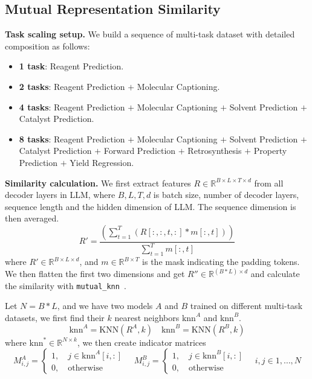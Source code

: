 \subsection{Mutual Representation Similarity}
\label{sec:simi}
\noindent\textbf{Task scaling setup.} We build a sequence of multi-task dataset with detailed composition as follows:
\begin{itemize}[leftmargin=*,nosep]
    \item \textbf{1 task}: Reagent Prediction.
    \item \textbf{2 tasks}: Reagent Prediction $+$ Molecular Captioning.
    \item \textbf{4 tasks}: Reagent Prediction $+$ Molecular Captioning $+$ Solvent Prediction $+$ Catalyst Prediction.
    \item \textbf{8 tasks}: Reagent Prediction $+$ Molecular Captioning $+$ Solvent Prediction $+$ Catalyst Prediction $+$ Forward Prediction $+$ Retrosynthesis $+$ Property Prediction $+$ Yield Regression.
\end{itemize}

\noindent\textbf{Similarity calculation.} We first extract features $R\in \mathbb{R}^{B\times L\times T\times d}$ from all decoder layers in LLM, where $B, L, T, d$ is batch size, number of decoder layers, sequence length and the hidden dimension of LLM. The sequence dimension is then averaged.
\begin{equation}
    R' = \frac{\left(\sum_{t=1}^{T} (R[:,:,t,:] * m[:,t])\right)}{\sum_{t=1}^{T} m[:,t]}
\end{equation}
where $R'\in\mathbb{R}^{B\times L\times d}$, and $m\in\mathbb{R}^{B\times T}$ is the mask indicating the padding tokens. We then flatten the first two dimensions and get $R''\in \mathbb{R}^{(B*L)\times d}$ and calculate the similarity with  \texttt{mutual\_knn}~\cite{huh2024platonic}.

Let $N=B*L$, and we have two models $A$ and $B$ trained on different multi-task datasets, we first find their $k$ nearest neighbors $\text{knn}^A$ and $\text{knn}^B$.
\begin{equation}
    \text{knn}^A = \text{KNN}(R^A,k)\quad \text{knn}^B=\text{KNN}(R^B,k)
\end{equation}
where $\text{knn}^{*}\in \mathbb{R}^{N\times k}$, we then create indicator matrices
\begin{equation}
    M_{i,j}^A = 
    \begin{cases}
        1, \quad j\in \text{knn}^A[i,:]\\
        0, \quad \text{otherwise}
    \end{cases}
    \quad
    M_{i,j}^B = 
    \begin{cases}
        1, \quad j\in \text{knn}^B[i,:]\\
        0, \quad \text{otherwise}
    \end{cases}\quad i,j\in 1,\dots,N
\end{equation}

